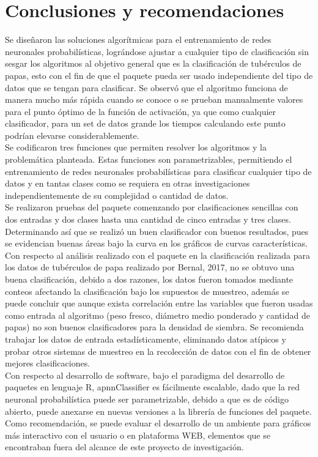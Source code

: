 \chapter{Conclusiones y recomendaciones}

	Se diseñaron las soluciones algorítmicas para el entrenamiento de redes neuronales probabilísticas, lográndose ajustar a cualquier tipo de clasificación sin sesgar los algoritmos al objetivo general que es la clasificación de tubérculos de papas, esto con el fin de que el paquete pueda ser usado independiente del tipo de datos que se tengan para clasificar. Se observó que el algoritmo funciona de manera mucho más rápida cuando se conoce o se prueban manualmente valores para el punto óptimo de la función de activación, ya que como cualquier clasificador, para un set de datos grande los tiempos calculando este punto podrían elevarse considerablemente.\\

Se codificaron tres funciones que permiten resolver los algoritmos y la problemática planteada. Estas funciones son parametrizables, permitiendo el entrenamiento de redes neuronales probabilísticas para clasificar cualquier tipo de datos y en tantas clases como se requiera en otras investigaciones independientemente de su complejidad o cantidad de datos. \\

Se realizaron pruebas del paquete comenzando por clasificaciones sencillas con dos entradas y dos clases hasta una cantidad de cinco entradas y tres clases. Determinando así que se realizó un buen clasificador con buenos resultados, pues se evidencian buenas áreas bajo la curva en los gráficos de curvas características. \\

Con respecto al análisis realizado con el paquete en la clasificación realizada para los datos de tubérculos de papa realizado por Bernal, 2017, no se obtuvo una buena clasificación, debido a dos razones, los datos fueron tomados mediante conteos afectando la clasificación bajo los supuestos de muestreo, además se puede concluir que aunque exista correlación entre las variables que fueron usadas como entrada al algoritmo (peso fresco, diámetro medio ponderado y cantidad de papas) no son buenos clasificadores para la densidad de siembra. Se recomienda trabajar los datos de entrada estadísticamente, eliminando datos atípicos y probar otros sistemas de muestreo en la recolección de datos con el fin de obtener mejores clasificaciones.\\

Con respecto al desarrollo de software, bajo el paradigma del desarrollo de paquetes en lenguaje R, apnnClassifier es fácilmente escalable, dado que la red neuronal probabilística puede ser parametrizable, debido a que es de código abierto, puede anexarse en nuevas versiones a la
librería de funciones del paquete.\\

Como recomendación, se puede evaluar el desarrollo de un ambiente para gráficos más interactivo con el usuario o en plataforma WEB, elementos que se encontraban fuera del alcance de este proyecto de investigación.\\
